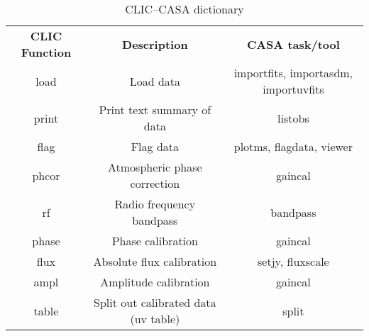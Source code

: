 \vspace{5mm}
\begin{table}[hb]
\caption[CLIC--CASA dictionary]
        {\label{table:clic} CLIC--CASA dictionary}
\begin{center}
\begin{tabular}{|c|c|c|} \hline
{\bf CLIC Function}  & {\bf Description}           &   {\bf CASA task/tool}  \\
  load              & Load data                    &  importfits,
  importasdm, importuvfits \\
  print             & Print text summary of data   &  listobs \\ 
  flag              & Flag data                    &  plotms, flagdata, viewer \\
  phcor             & Atmospheric phase correction &  gaincal \\  
  rf                & Radio frequency bandpass     &  bandpass \\
  phase             & Phase calibration            &  gaincal \\
  flux              & Absolute flux calibration    &  setjy, fluxscale \\
  ampl              & Amplitude calibration        &  gaincal \\
  table             & Split out calibrated data (uv table)  &   split \\
\hline
\end{tabular}
\end{center}
\end{table}


